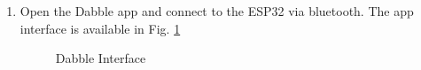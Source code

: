 \documentclass[conference]{IEEEtran}
\begin{document}
\begin{enumerate}
\item Open the Dabble app and connect to the ESP32 via bluetooth. The app interface is available in Fig. \ref{fig:dabble_home}
\begin{figure}[!h]
\centering
%
\caption{Dabble Interface}
\label{fig:dabble_home}
\end{figure}


\end{enumerate}
\end{document}
